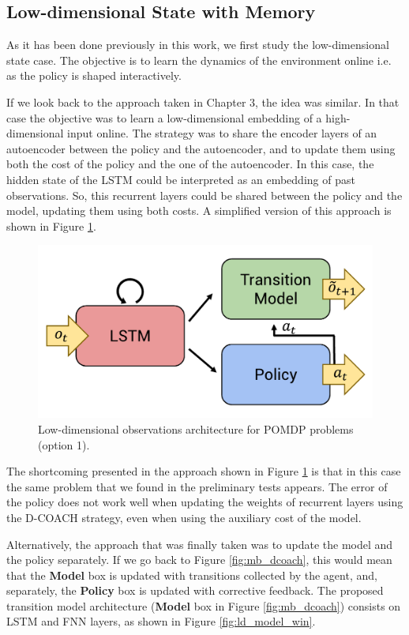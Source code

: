 \subsection{Low-dimensional State with Memory}
\label{sec:ld_memory}
As it has been done previously in this work, we first study the low-dimensional state case. The objective is to learn the dynamics of the environment online i.e. as the policy is shaped interactively. 

If we look back to the approach taken in Chapter 3, the idea was similar. In that case the objective was to learn a low-dimensional embedding of a high-dimensional input online. The strategy was to share the encoder layers of an autoencoder between the policy and the autoencoder, and to update them using both the cost of the policy and the one of the autoencoder. In this case, the hidden state of the LSTM could be interpreted as an embedding of past observations. So, this recurrent layers could be shared between the policy and the model, updating them using both costs. A simplified version of this approach is shown in Figure \ref{fig:ld_model_rip}.

\begin{figure}[h]
    \centering
    \includegraphics[width=0.6\linewidth]{imagenes/cap4/ld_model_rip.pdf}
    \caption{Low-dimensional observations architecture for POMDP problems (option 1).}
    \label{fig:ld_model_rip}
\end{figure}

The shortcoming presented in the approach shown in Figure \ref{fig:ld_model_rip} is that in this case the same problem that we found in the preliminary tests appears. The error of the policy does not work well when updating the weights of recurrent layers using the D-COACH strategy, even when using the auxiliary cost of the model. 

Alternatively, the approach that was finally taken was to update the model and the policy separately. If we go back to Figure \ref{fig:mb_dcoach}, this would mean that the \textbf{Model} box is updated with transitions collected by the agent, and, separately, the \textbf{Policy} box is updated with corrective feedback. The proposed transition model architecture (\textbf{Model} box in Figure \ref{fig:mb_dcoach}) consists on LSTM and FNN layers, as shown in Figure \ref{fig:ld_model_win}.

